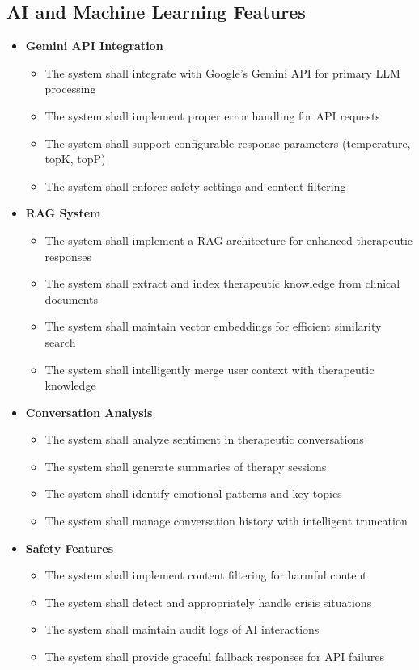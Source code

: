 \subsection{AI and Machine Learning Features}
\begin{itemize}
    \item \textbf{Gemini API Integration}
    \begin{itemize}
        \item The system shall integrate with Google's Gemini API for primary LLM processing
        \item The system shall implement proper error handling for API requests
        \item The system shall support configurable response parameters (temperature, topK, topP)
        \item The system shall enforce safety settings and content filtering
    \end{itemize}
    
    \item \textbf{RAG System}
    \begin{itemize}
        \item The system shall implement a RAG architecture for enhanced therapeutic responses
        \item The system shall extract and index therapeutic knowledge from clinical documents
        \item The system shall maintain vector embeddings for efficient similarity search
        \item The system shall intelligently merge user context with therapeutic knowledge
    \end{itemize}
    
    \item \textbf{Conversation Analysis}
    \begin{itemize}
        \item The system shall analyze sentiment in therapeutic conversations
        \item The system shall generate summaries of therapy sessions
        \item The system shall identify emotional patterns and key topics
        \item The system shall manage conversation history with intelligent truncation
    \end{itemize}
    
    \item \textbf{Safety Features}
    \begin{itemize}
        \item The system shall implement content filtering for harmful content
        \item The system shall detect and appropriately handle crisis situations
        \item The system shall maintain audit logs of AI interactions
        \item The system shall provide graceful fallback responses for API failures
    \end{itemize}
\end{itemize}

